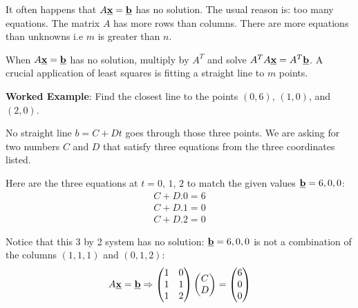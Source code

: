 \documentclass[10pt,a4paper]{article}
\begin{document}
It often happens that $A\textbf{\underline{x}} = \textbf{\underline{b}}$ has no solution. The usual
reason is: too many equations. The matrix $A$ has more rows than columns. There are more equations
than unknowns i.e $m$ is greater than $n$. 

When $A\textbf{\underline{x}} = \textbf{\underline{b}}$ has no solution, multiply by $A^T$ and solve
$A^T A \textbf{\underline{x}} = A^T \textbf{\underline{b}}$. A crucial application of least squares
is fitting a straight line to $m$ points.

\textbf{Worked Example}: Find the closest line to the points $(0, 6)$, $(1, 0)$, and $(2, 0)$. 

No straight line $b =  C + Dt$ goes through those three points. We are asking for two numbers $C$
and $D$ that satisfy three equations from the three coordinates listed.  

Here are the three equations at $t = 0$, $1$, $2$ to match the given values $\textbf{\underline{b}} = 6, 0, 0$: 
\begin{align*}
    C + D.0 = 6 \\
    C + D.1 = 0 \\
    C + D.2 = 0
\end{align*}

Notice that this 3 by 2 system has no solution: $\textbf{\underline{b}} = 6, 0, 0$ is not a
combination of the columns $(1, 1, 1)$ and $(0, 1, 2)$:
\begin{align*}
    A\textbf{\underline{x}} = \textbf{\underline{b}} \Rightarrow \begin{pmatrix}
        1&0 \\
        1&1 \\
        1&2
    \end{pmatrix}\begin{pmatrix}
        C \\ D
    \end{pmatrix} = \begin{pmatrix}
        6\\0\\0
    \end{pmatrix}
\end{align*}
\end{document}

